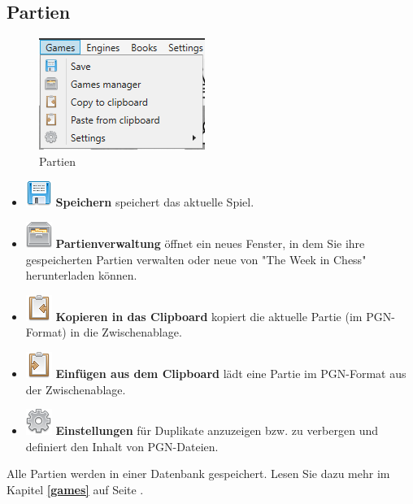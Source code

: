 \documentclass[11pt,a4paper]{article}
\begin{document}
	\subsection{Partien}
	\begin{figure}[H]
		\centering
		\includegraphics[scale=1.0]{Games1.png}
		\caption{Partien}
		\label{fig:Games}
	\end{figure}
	\begin{itemize}
		\item \includegraphics[scale=0.5]{diskette.png} \textbf{Speichern} speichert das aktuelle Spiel.
		\item \includegraphics[scale=0.5]{file_manager.png}  \textbf{Partienverwaltung} öffnet ein neues Fenster, in dem Sie ihre gespeicherten Partien verwalten oder neue von "The Week in Chess" \space herunterladen können.
		\item \includegraphics[scale=0.5]{clipboard_sign_out.png}  \textbf{Kopieren in das Clipboard} kopiert die aktuelle Partie (im PGN-Format) in die Zwischenablage.	
		\item \includegraphics[scale=0.5]{clipboard_sign.png}  \textbf{Einfügen aus dem Clipboard} lädt eine Partie im PGN-Format aus der Zwischenablage.
		\item \includegraphics[scale=0.5]{cog.png}  \textbf{Einstellungen} für Duplikate anzuzeigen bzw. zu verbergen und definiert den Inhalt von PGN-Dateien.
		
	\end{itemize}
	Alle Partien werden in einer Datenbank gespeichert. Lesen Sie dazu mehr im Kapitel \textbf{\ref{games}  } auf Seite \pageref{games}.
	
\end{document}
